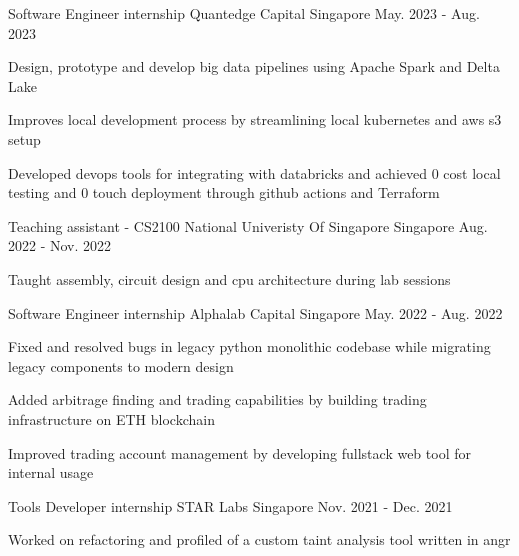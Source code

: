 

\begin{cventries}

  \cventry
    {Software Engineer internship}
    {Quantedge Capital}
    {Singapore}
    {May. 2023 - Aug. 2023}
    {
        \begin{cvitems}
            \item {Design, prototype and develop big data pipelines using Apache Spark and Delta Lake}
            \item {Improves local development process by streamlining local kubernetes and aws s3 setup}
            \item {Developed devops tools for integrating with databricks and achieved 0 cost local testing and 0 touch deployment through github actions and Terraform}
        \end{cvitems}
    }

  \cventry
    {Teaching assistant - CS2100}
    {National Univeristy Of Singapore}
    {Singapore}
    {Aug. 2022 - Nov. 2022}
    {
        \begin{cvitems}
            \item {Taught assembly, circuit design and cpu architecture during lab sessions}
        \end{cvitems}
    }

  \cventry
    {Software Engineer internship}
    {Alphalab Capital}
    {Singapore}
    {May. 2022 - Aug. 2022}
    {
        \begin{cvitems}
            \item {Fixed and resolved bugs in legacy python monolithic codebase while migrating legacy components to modern design}
            \item {Added arbitrage finding and trading capabilities by building trading infrastructure on ETH blockchain }
            \item {Improved trading account management by developing fullstack web tool for internal usage}
        \end{cvitems}
    }

  \cventry
    {Tools Developer internship} %
    {STAR Labs} %
    {Singapore} %
    {Nov. 2021 - Dec. 2021} %
    {
      \begin{cvitems} %
        \item {Worked on refactoring and profiled of a custom taint analysis tool written in angr}
      \end{cvitems}
    }


\end{cventries}
